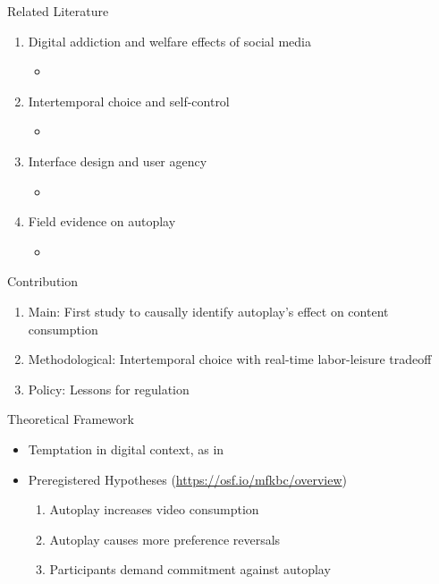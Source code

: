 \documentclass[aspectratio=169,xcolor=dvipsnames]{beamer}
\begin{document}

\begin{frame}{Related Literature}
  \begin{enumerate}
    \item Digital addiction and welfare effects of social media
          \begin{itemize}
            \item \citet{allcott2020welfare, allcott2022digital, braghieri2022aer, bursztyn2023}
          \end{itemize}
    \item Intertemporal choice and self-control
          \begin{itemize}
            \item \citet{ericson2019intertemporal, houser2018gaeb, bonein2015self, ek2023too}
          \end{itemize}
    \item Interface design and user agency
          \begin{itemize}
            \item \citet{mathur2021p2cchfcs, lyngs2020p2cchfcs, lukoff2021design,schaffner2023pahia, purohit2023starving}
          \end{itemize}
    \item Field evidence on autoplay
          \begin{itemize}
            \item \citet{hiniker2018coco, schaffner2025pahi}
          \end{itemize}
  \end{enumerate}
\end{frame}

\begin{frame}{Contribution}
  \begin{enumerate} %
    \item Main: First study to causally identify autoplay's effect on content consumption
    \item Methodological: Intertemporal choice with real-time labor-leisure tradeoff
    \item Policy: Lessons for regulation
  \end{enumerate}
\end{frame}

\begin{frame}{Theoretical Framework}
  \begin{itemize} %
    \item Temptation in digital context, as in \citet{kleinberg2022challenge}
    \item Preregistered Hypotheses (\url{https://osf.io/mfkbc/overview})
          \begin{enumerate}
            \item Autoplay increases video consumption
            \item Autoplay causes more preference reversals
            \item Participants demand commitment against autoplay
          \end{enumerate}
  \end{itemize}
\end{frame}
\end{document}

